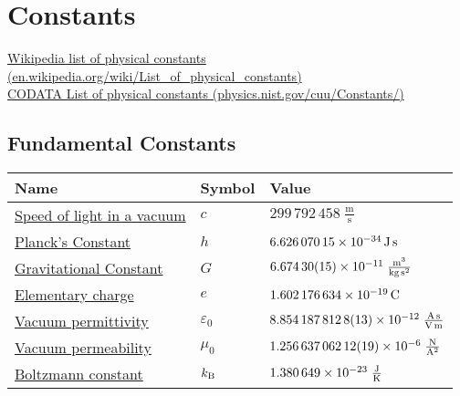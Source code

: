 \section{Constants}
	\href{https://en.wikipedia.org/wiki/List_of_physical_constants}{Wikipedia list of physical constants (en.wikipedia.org/wiki/List\_of\_physical\_constants)}\\
	\href{https://physics.nist.gov/cuu/Constants/}{CODATA List of physical constants (physics.nist.gov/cuu/Constants/)}
	\subsection{Fundamental Constants}
		\begin{center}
		\begin{tabular}{| L{.35\textwidth} L{.15\textwidth} L{.4\textwidth} |}
			\hline Name & Symbol & Value \\ \hline \hline
			\href{https://en.wikipedia.org/wiki/Speed_of_light}{Speed of light in a vacuum} & $c$ & $299\,792\,458\;\frac{\mathrm{m}}{\mathrm{s}}$ \exact \\ \hline
			\href{https://en.wikipedia.org/wiki/Planck_constant}{Planck's Constant} & $h$ & $6.626\,070\,15\times 10^{-34}\,\mathrm{J\,s}$ \exact \\ \hline
			\href{https://en.wikipedia.org/wiki/Gravitational_constant}{Gravitational Constant} & $G$ & $6.674\,30(15)\times 10^{-11}\;\frac{\mathrm{m^3}}{\mathrm{kg\,s^2}} $ \\ \hline
			\href{https://en.wikipedia.org/wiki/Elementary_charge}{Elementary charge} & $e$ & $1.602\,176\,634\times 10^{-19}\,\mathrm{C}$ \exact \\ \hline
			\href{https://en.wikipedia.org/wiki/Vacuum_permittivity}{Vacuum permittivity}  & $\varepsilon_0$ & $8.854\,187\,812\,8(13)\times 10^{-12}\;\frac{\mathrm{A\,s}}{\mathrm{V\,m}}$ \\ \hline
			\href{https://en.wikipedia.org/wiki/Vacuum_permeability}{Vacuum permeability}  & $\mu_0$ & $1.256\,637\,062\,12(19)\times 10^{-6}\;\frac{\mathrm{N}}{\mathrm{A^2}}$ \\ \hline
			\href{https://en.wikipedia.org/wiki/Boltzmann_constant}{Boltzmann constant} & $k_{\text{B}}$ & $1.380\,649\times 10^{-23}\;\frac{\mathrm{J}}{\mathrm{K}}$ \exact \\ \hline
		\end{tabular}
		\end{center}

